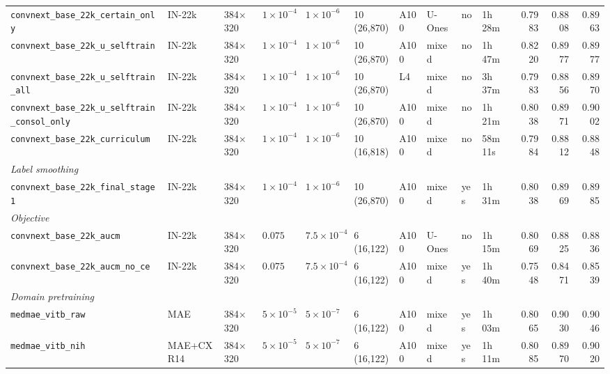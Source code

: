\begin{landscape}
\begin{longtable}{llllllllllrrr}
    \texttt{\scriptsize convnext\_base\_22k\_certain\_only} & IN-22k & 384$\times$320 & $1\times10^{-4}$ & $1\times10^{-6}$ & 10 (26,870) & A100 & U-Ones & no & 1h\,28m & 0.7983 & 0.8808 & 0.8963 \\
    \texttt{\scriptsize convnext\_base\_22k\_u\_selftrain} & IN-22k & 384$\times$320 & $1\times10^{-4}$ & $1\times10^{-6}$ & 10 (26,870) & A100 & mixed & no & 1h\,47m & 0.8220 & 0.8977 & 0.8977 \\
    \texttt{\scriptsize convnext\_base\_22k\_u\_selftrain\_all} & IN-22k & 384$\times$320 & $1\times10^{-4}$ & $1\times10^{-6}$ & 10 (26,870) & L4 & mixed & no & 3h\,37m & 0.7983 & 0.8856 & 0.8970 \\
    \texttt{\scriptsize convnext\_base\_22k\_u\_selftrain\_consol\_only} & IN-22k & 384$\times$320 & $1\times10^{-4}$ & $1\times10^{-6}$ & 10 (26,870) & A100 & mixed & no & 1h\,21m & 0.8038 & 0.8971 & 0.9002 \\
    \texttt{\scriptsize convnext\_base\_22k\_curriculum} & IN-22k & 384$\times$320 & $1\times10^{-4}$ & $1\times10^{-6}$ & 10 (16,818) & A100 & mixed & no & 58m\,11s & 0.7984 & 0.8812 & 0.8848 \\
    \midrule
    \multicolumn{13}{l}{\textit{Label smoothing}} \\
    \texttt{\scriptsize convnext\_base\_22k\_final\_stage1} & IN-22k & 384$\times$320 & $1\times10^{-4}$ & $1\times10^{-6}$ & 10 (26,870) & A100 & mixed & yes & 1h\,31m & 0.8038 & 0.8969 & 0.8985 \\
    \midrule
    \multicolumn{13}{l}{\textit{Objective}} \\
    \texttt{\scriptsize convnext\_base\_22k\_aucm} & IN-22k & 384$\times$320 & $0.075$ & $7.5\times10^{-4}$ & 6 (16,122) & A100 & U-Ones & no & 1h\,15m & 0.8069 & 0.8825 & 0.8836 \\
    \texttt{\scriptsize convnext\_base\_22k\_aucm\_no\_ce} & IN-22k & 384$\times$320 & $0.075$ & $7.5\times10^{-4}$ & 6 (16,122) & A100 & mixed & yes & 1h\,40m & 0.7548 & 0.8471 & 0.8539 \\
    \midrule
    \multicolumn{13}{l}{\textit{Domain pretraining}} \\
    \texttt{\scriptsize medmae\_vitb\_raw} & MAE & 384$\times$320 & $5\times10^{-5}$ & $5\times10^{-7}$ & 6 (16,122) & A100 & mixed & yes & 1h\,03m & 0.8065 & 0.9030 & 0.9046 \\
    \texttt{\scriptsize medmae\_vitb\_nih} & MAE+CXR14 & 384$\times$320 & $5\times10^{-5}$ & $5\times10^{-7}$ & 6 (16,122) & A100 & mixed & yes & 1h\,11m & 0.8085 & 0.8970 & 0.9020 \\

\end{longtable}
\end{landscape}
